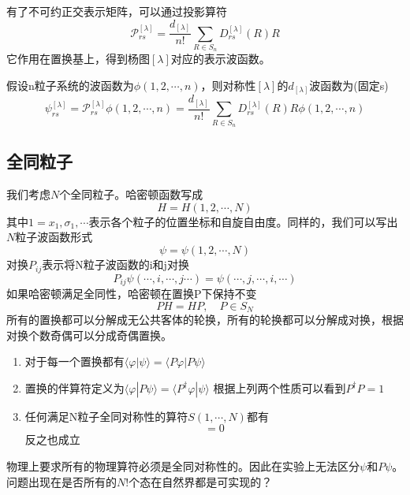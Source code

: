 \documentclass[12pt]{article}
\begin{document}
有了不可约正交表示矩阵，可以通过投影算符
\begin{equation*}
    \mathcal{P}_{rs}^{[\lambda]}=\frac{d_{[\lambda]}}{n!}\sum_{R\in S_n}D_{rs}^{[\lambda]}(R)R
\end{equation*}
它作用在置换基上，得到杨图$[\lambda]$对应的表示波函数。

假设n粒子系统的波函数为$\phi(1,2,\cdots,n)$，则对称性$[\lambda]$的$d_{[\lambda]}$波函数为(固定s)
\begin{equation*}
    \psi_{rs}^{[\lambda]}=\mathcal{P}_{rs}^{[\lambda]}\phi(1,2,\cdots,n)=\frac{d_{[\lambda]}}{n!}\sum_{R\in S_n}D_{rs}^{[\lambda]}(R)R\phi(1,2,\cdots,n)
\end{equation*}
\subsection{全同粒子}
我们考虑$N$个全同粒子。哈密顿函数写成
\begin{equation*}
    H=H(1,2,\cdots,N)
\end{equation*}
其中$1=x_1,\sigma_1,\cdots$表示各个粒子的位置坐标和自旋自由度。同样的，我们可以写出$N$粒子波函数形式
\begin{equation*}
    \psi=\psi(1,2,\cdots,N)
\end{equation*}
对换$P_{ij}$表示将N粒子波函数的i和j对换
\begin{equation*}
    P_{ij}\psi(\cdots,i,\cdots,j\cdots)=\psi(\cdots,j,\cdots,i,\cdots)
\end{equation*}
如果哈密顿满足全同性，哈密顿在置换P下保持不变
\begin{equation*}
    PH=HP,\quad P\in S_N
\end{equation*}
所有的置换都可以分解成无公共客体的轮换，所有的轮换都可以分解成对换，根据对换个数奇偶可以分成奇偶置换。
\begin{enumerate}
    \item 对于每一个置换都有$\langle\varphi|\psi\rangle=\langle P\varphi|P\psi\rangle$
    \item 置换的伴算符定义为$\langle\varphi|P\psi\rangle=\langle P^\dagger\varphi|\psi\rangle$
    根据上列两个性质可以看到$P^\dagger P=1$
    \item 任何满足N粒子全同对称性的算符$S(1,\cdots,N)$都有
    \begin{equation*}
        [P,S]=0
    \end{equation*}
    反之也成立
\end{enumerate}
物理上要求所有的物理算符必须是全同对称性的。因此在实验上无法区分$\psi$和$P\psi$。问题出现在是否所有的$N!$个态在自然界都是可实现的？
\end{document}
